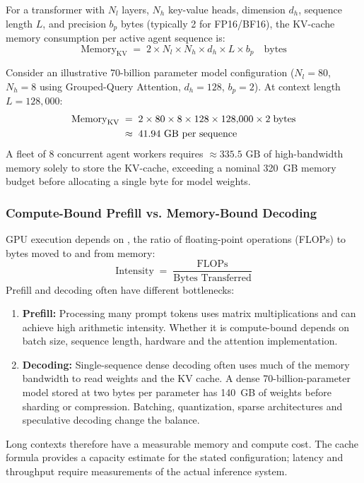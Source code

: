 For a transformer with $N_l$ layers, $N_h$ key-value heads, dimension $d_h$, sequence length $L$, and precision $b_p$ bytes (typically 2 for FP16/BF16), the KV-cache memory consumption per active agent sequence is:
\begin{equation}\label{eq:kv-cache-full}
\mathrm{Memory}_{\mathrm{KV}} \;=\; 2 \times N_l \times N_h \times d_h \times L \times b_p \quad \text{bytes}
\end{equation}

Consider an illustrative 70-billion parameter model configuration ($N_l = 80$, $N_h = 8$ using Grouped-Query Attention, $d_h = 128$, $b_p = 2$). At context length $L = 128{,}000$:
\begin{align}
\mathrm{Memory}_{\mathrm{KV}} &\;=\; 2 \times 80 \times 8 \times 128 \times 128{,}000 \times 2 \;\text{bytes} \notag \\
&\;\approx\; 41.94\text{ GB per sequence}
\end{align}
A fleet of 8 concurrent agent workers requires $\approx 335.5\text{ GB}$ of high-bandwidth memory solely to store the KV-cache, exceeding a nominal 320~GB memory budget before allocating a single byte for model weights.

\subsubsection{Compute-Bound Prefill vs. Memory-Bound Decoding}
GPU execution depends on , the ratio of floating-point operations (FLOPs) to bytes moved to and from memory:
\begin{equation}
\mathrm{Intensity} \;=\; \frac{\text{FLOPs}}{\text{Bytes Transferred}}
\end{equation}
Prefill and decoding often have different bottlenecks:
\begin{enumerate}[leftmargin=1.8em,itemsep=2pt]
  \item \textbf{Prefill:} Processing many prompt tokens uses matrix multiplications and can achieve high arithmetic intensity. Whether it is compute-bound depends on batch size, sequence length, hardware and the attention implementation.
  \item \textbf{Decoding:} Single-sequence dense decoding often uses much of the memory bandwidth to read weights and the KV cache. A dense 70-billion-parameter model stored at two bytes per parameter has 140~GB of weights before sharding or compression. Batching, quantization, sparse architectures and speculative decoding change the balance.
\end{enumerate}
Long contexts therefore have a measurable memory and compute cost. The cache formula provides a capacity estimate for the stated configuration; latency and throughput require measurements of the actual inference system.

